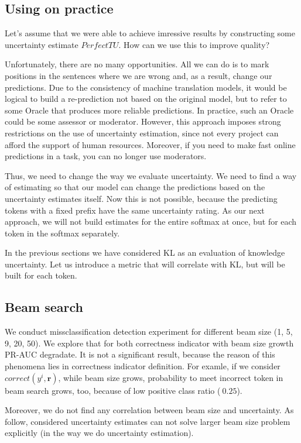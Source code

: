 \documentclass[a4paper,14pt]{extarticle}
\begin{document}
\subsection{Using on practice}
	Let's assume that we were able to achieve imressive results by constructing some uncertainty estimate $PerfectTU$. How can we use this to improve quality?

	Unfortunately, there are no many opportunities. All we can do is to mark positions in the sentences where we are wrong and, as a result, change our predictions. Due to the consistency of machine translation models, it would be logical to build a re-prediction not based on the original model, but to refer to some Oracle that produces more reliable predictions. In practice, such an Oracle could be some assessor or moderator. However, this approach imposes strong restrictions on the use of uncertainty estimation, since not every project can afford the support of human resources. Moreover, if you need to make fast online predictions in a task, you can no longer use moderators.

	Thus, we need to change the way we evaluate uncertainty. We need to find a way of estimating so that our model can change the predictions based on the uncertainty estimates itself. Now this is not possible, because the predicting tokens with a fixed prefix have the same uncertainty rating. As our next approach, we will not build estimates for the entire softmax at once, but for each token in the softmax separately.

	In the previous sections we have considered KL as an evaluation of knowledge uncertainty. Let us introduce a metric that will correlate with KL, but will be built for each token.
	
\subsection{Beam search}
	We conduct missclassification detection experiment for different beam size (1, 5, 9, 20, 50). We explore that for both correctness indicator with beam size growth PR-AUC degradate. It is not a significant result, because the reason of this phenomena lies in correctness indicator definition. For examle, if we consider $correct(y^i, \textbf{r})$, while beam size grows, probability to meet incorrect token in beam search grows, too, because of low positive class ratio ($~0.25$).
	
	Moreover, we do not find any correlation between beam size and uncertainty. As follow, considered uncertainty estimates can not solve larger beam size problem explicitly (in the way we do uncertainty estimation).
\end{document}
